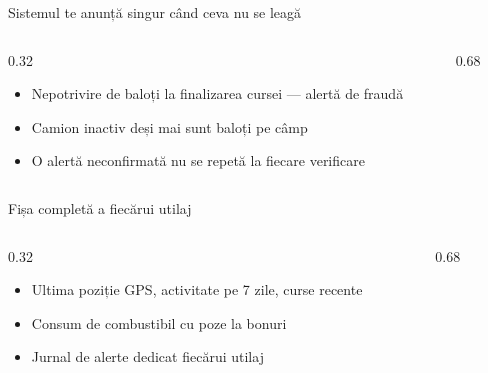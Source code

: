 \documentclass[aspectratio=169,10pt]{beamer}
\begin{document}
\begin{frame}{Sistemul te anunță singur când ceva nu se leagă}
  \begin{columns}[T]
    \begin{column}{0.32\linewidth}
      \vspace{0.3cm}
      \begin{itemize}
        \item Nepotrivire de baloți la finalizarea cursei — alertă de fraudă
        \item Camion inactiv deși mai sunt baloți pe câmp
        \item O alertă neconfirmată nu se repetă la fiecare verificare
      \end{itemize}
    \end{column}
    \begin{column}{0.68\linewidth}
    \end{column}
  \end{columns}
\end{frame}

\begin{frame}{Fișa completă a fiecărui utilaj}
  \begin{columns}[T]
    \begin{column}{0.32\linewidth}
      \vspace{0.3cm}
      \begin{itemize}
        \item Ultima poziție GPS, activitate pe 7 zile, curse recente
        \item Consum de combustibil cu poze la bonuri
        \item Jurnal de alerte dedicat fiecărui utilaj
      \end{itemize}
    \end{column}
    \begin{column}{0.68\linewidth}
    \end{column}
  \end{columns}
\end{frame}
\end{document}
